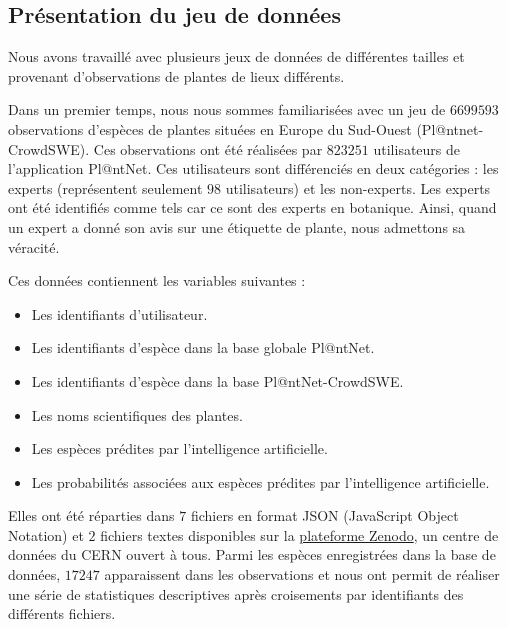 \documentclass[a4paper,12pt]{article}
\begin{document}
\subsection{Présentation du jeu de données}

Nous avons travaillé avec plusieurs jeux de données de différentes tailles et provenant d'observations de plantes de lieux différents.

\vspace{0.2cm}

Dans un premier temps, nous nous sommes familiarisées avec un jeu de $6 699 593$ observations d'espèces de plantes situées en Europe du Sud-Ouest (Pl@ntnet-CrowdSWE). Ces observations ont été réalisées par $823 251$ utilisateurs de l'application Pl@ntNet. Ces utilisateurs sont différenciés en deux catégories : les experts (représentent seulement $98$ utilisateurs) et les non-experts. Les experts ont été identifiés comme tels car ce sont des experts en botanique. Ainsi, quand un expert a donné son avis sur une étiquette de plante, nous admettons sa véracité. 

\vspace{0.2cm}

Ces données contiennent les variables suivantes :
\begin{itemize}
    \item Les identifiants d'utilisateur.
    \item Les identifiants d'espèce dans la base globale Pl@ntNet.
    \item Les identifiants d'espèce dans la base Pl@ntNet-CrowdSWE.
    \item Les noms scientifiques des plantes.
    \item Les espèces prédites par l'intelligence artificielle.
    \item Les probabilités associées aux espèces prédites par l'intelligence artificielle.
\end{itemize}

\vspace{0.2cm}

Elles ont été réparties dans $7$ fichiers en format JSON (JavaScript Object Notation) et $2$ fichiers textes disponibles sur la \href{https://zenodo.org/records/10782465}{plateforme Zenodo}, un centre de données du CERN ouvert à tous. Parmi les espèces enregistrées dans la base de données, $17 247$ apparaissent dans les observations et nous ont permit de réaliser une série de statistiques descriptives après croisements par identifiants des différents fichiers. 
\end{document}
